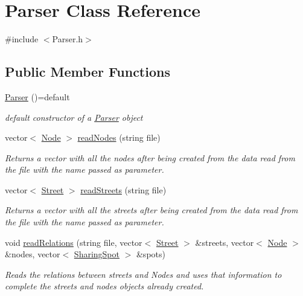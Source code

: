 \hypertarget{class_parser}{}\section{Parser Class Reference}
\label{class_parser}


{\ttfamily \#include $<$Parser.\+h$>$}

\subsection*{Public Member Functions}
\begin{DoxyCompactItemize}
\item 
\mbox{\label{class_parser_a5208129b497bfdf7c8ecceeb70e4bba8}} 
\mbox{\hyperlink{class_parser_a5208129b497bfdf7c8ecceeb70e4bba8}{Parser}} ()=default
\begin{DoxyCompactList}\small\item\em default constructor of a \mbox{\hyperlink{class_parser}{Parser}} object \end{DoxyCompactList}\item 
vector$<$ \mbox{\hyperlink{class_node}{Node}} $>$ \mbox{\hyperlink{class_parser_a6cb129a0533a784d9889fb522b3659f2}{read\+Nodes}} (string file)
\begin{DoxyCompactList}\small\item\em Returns a vector with all the nodes after being created from the data read from the file with the name passed as parameter. \end{DoxyCompactList}\item 
vector$<$ \mbox{\hyperlink{class_street}{Street}} $>$ \mbox{\hyperlink{class_parser_ac393c2185887253d615692ed871823f9}{read\+Streets}} (string file)
\begin{DoxyCompactList}\small\item\em Returns a vector with all the streets after being created from the data read from the file with the name passed as parameter. \end{DoxyCompactList}\item 
void \mbox{\hyperlink{class_parser_a67de76f90c398140fcc14c9ec7d8f00d}{read\+Relations}} (string file, vector$<$ \mbox{\hyperlink{class_street}{Street}} $>$ \&streets, vector$<$ \mbox{\hyperlink{class_node}{Node}} $>$ \&nodes, vector$<$ \mbox{\hyperlink{class_sharing_spot}{Sharing\+Spot}} $>$ \&spots)
\begin{DoxyCompactList}\small\item\em Reads the relations between streets and Nodes and uses that information to complete the streets and nodes objects already created. \end{DoxyCompactList}\item 

\end{DoxyCompactItemize}
